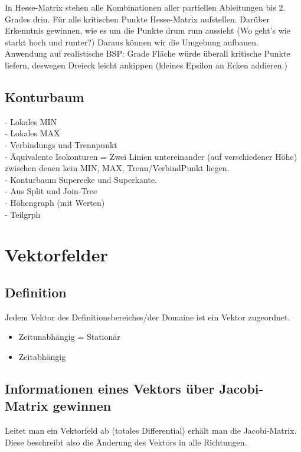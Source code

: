 \documentclass{article}
\begin{document}
In Hesse-Matrix stehen alle Kombinationen aller partiellen Ableitungen bis 2. Grades drin.
Für alle kritischen Punkte Hesse-Matrix aufstellen. Darüber Erkenntnis gewinnen, wie es um die Punkte drum rum aussieht (Wo geht's wie starkt hoch und runter?) Daraus können wir die Umgebung aufbauen.\\

\noindent Anwendung auf realistische BSP: Grade Fläche würde überall kritische Punkte liefern, deswegen Dreieck leicht ankippen (kleines Epsilon an Ecken addieren.)

\subsection{Konturbaum}
- Lokales MIN\\
- Lokales MAX\\
- Verbindungs und Trennpunkt\\

\noindent - Äquivalente Isokonturen = Zwei Linien untereinander (auf verschiedener Höhe) zwischen denen kein MIN, MAX, Trenn/VerbindPunkt liegen.\\

\noindent - Konturbaum Superecke und Superkante.\\
- Aus Split und Join-Tree\\
- Höhengraph (mit Werten)\\
- Teilgrph\\


\pagebreak
\section{Vektorfelder}
\subsection{Definition}
Jedem Vektor des Definitionsbereiches/der Domaine ist ein Vektor zugeordnet.

\begin{itemize}[noitemsep]
	\item Zeitunabhängig = Stationär	
	\item Zeitabhängig
\end{itemize}

\subsection{Informationen eines Vektors über Jacobi-Matrix gewinnen}
Leitet man ein Vektorfeld ab (totales Differential) erhält man die Jacobi-Matrix. Diese beschreibt also die Änderung des Vektors in alle Richtungen.\\
\end{document}
